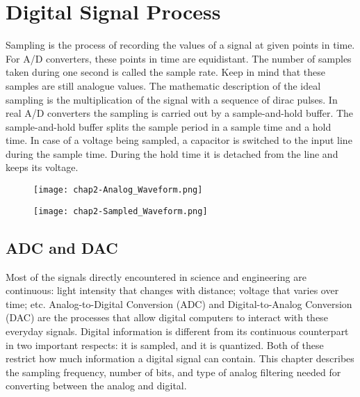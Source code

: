\chapter{Digital Signal Process} %

\label{Chapter2} %


\cite{wiki-dsp-sampling}
Sampling is the process of recording the values of a signal at given points in time. For A/D converters, these points in time are equidistant. The number of samples taken during one second is called the sample rate. Keep in mind that these samples are still analogue values. The mathematic description of the ideal sampling is the multiplication of the signal with a sequence of dirac pulses. In real A/D converters the sampling is carried out by a sample-and-hold buffer. The sample-and-hold buffer splits the sample period in a sample time and a hold time. In case of a voltage being sampled, a capacitor is switched to the input line during the sample time. During the hold time it is detached from the line and keeps its voltage.

\begin{figure}[ht]
  \centering
    \texttt{[image: chap2-Analog\_Waveform.png]}
  \caption{}
  \label{fig:chap2-Analog_Waveform}
\end{figure}

\begin{figure}[ht]
  \centering
    \texttt{[image: chap2-Sampled\_Waveform.png]}
  \caption{}
  \label{fig:chap2-Sampled_Waveform}
\end{figure}

\section{ADC and DAC}\cite{smith1997dspbook}
Most of the signals directly encountered in science and engineering are continuous:
light intensity that changes with distance; voltage that varies over time; etc.
Analog-to-Digital Conversion (ADC) and Digital-to-Analog Conversion (DAC) are
the processes that allow digital computers to interact with these everyday signals.
Digital information is different from its continuous counterpart in two important respects:
it is sampled, and it is quantized. Both of these restrict how much information a digital signal can
contain. This chapter describes the sampling frequency, number of bits, and type of analog
filtering needed for converting between the analog and digital.

